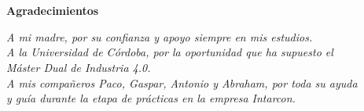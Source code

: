 \chapter*{}

\begin{flushright}
    \Huge{\textbf{Agradecimientos}}
\end{flushright}
\vspace{10mm}
\begin{flushright}
    \textit{A mi madre, por su confianza y apoyo siempre en mis estudios. \\
    A la Universidad de Córdoba, por la oportunidad que ha supuesto el \\ Máster Dual de Industria 4.0. \\
    A mis compañeros Paco, Gaspar, Antonio y Abraham, por toda su ayuda \\ y guía durante la etapa de prácticas en la empresa Intarcon.}
\end{flushright}
